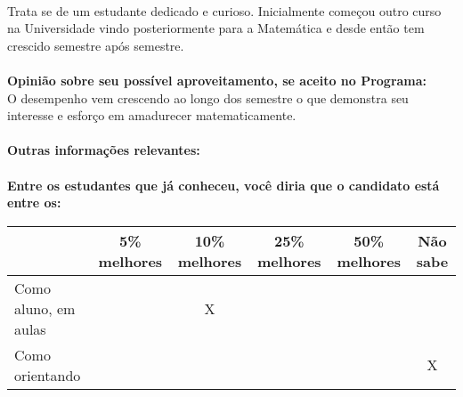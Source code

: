 \documentclass[11pt]{article}
\begin{document}
\\Trata se de um estudante dedicado e curioso. Inicialmente começou outro curso na Universidade vindo posteriormente para a Matemática e desde então tem crescido semestre após semestre.\\
\\
\textbf{Opinião sobre seu possível aproveitamento, se aceito no Programa:}
\\O desempenho vem crescendo ao longo dos semestre o que demonstra seu interesse e esforço em amadurecer matematicamente.\\ 
\\
\textbf{Outras informações relevantes:} \\
\\[0.3cm]
\textbf{Entre os estudantes que já conheceu, você diria que o candidato está entre os:}
\\
\begin{tabular}{|l|c|c|c|c|c|}
\hline
 & 5\% melhores & 10\% melhores & 25\% melhores & 50\% melhores & Não sabe \\
\hline
Como aluno, em aulas &  & X &  &  & \\
\hline
Como orientando &  &  &  &  & X\\
\hline
\end{tabular}
\end{document}
